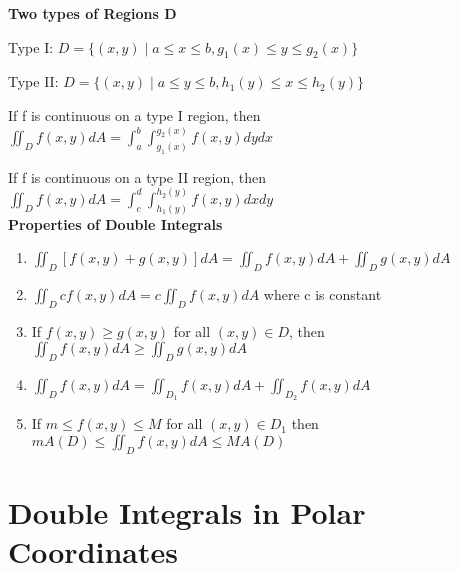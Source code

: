 \documentclass{article}
\begin{document}
\textbf{Two types of Regions D}

Type I: $D = \{(x, y) \mid a \leq x \leq b, g_1(x) \leq y \leq g_2(x) \}$

Type II: $D = \{(x, y) \mid a \leq y \leq b, h_1(y) \leq x \leq h_2(y)\}$

If f is continuous on a type I region, then 
$\iint_D f(x, y)dA = \int_a^b \int_{g_1(x)}^{g_2(x)} f(x, y) dydx$


If f is continuous on a type II region, then 
$\iint_D f(x, y) dA = \int_c^d \int_{h_1(y)}^{h_2(y)} f(x, y) dxdy$\\


\textbf{Properties of Double Integrals}
\begin{enumerate}
\item $\iint_D [f(x, y) + g(x, y)] dA = \iint_D f(x, y) dA + \iint_D g(x, y)dA$
\item $\iint_D cf(x, y) dA = c\iint_D f(x,y) dA$  where c is constant
\item If $f(x, y) \geq g(x, y)$ for all $(x, y) \in D$, then $\iint_D f(x, y) dA \geq \iint_D g(x, y) dA$
\item  $\iint_D f(x, y) dA = \iint_{D_1} f(x, y) dA + \iint_{D_2} f(x, y) dA$
\item If $m \leq f(x, y) \leq M$ for all $(x,y) \in D_1$ then $m A(D) \leq \iint_D f(x, y) dA \leq M A(D)$
\end{enumerate}

\section{Double Integrals in Polar Coordinates}






\end{document}
